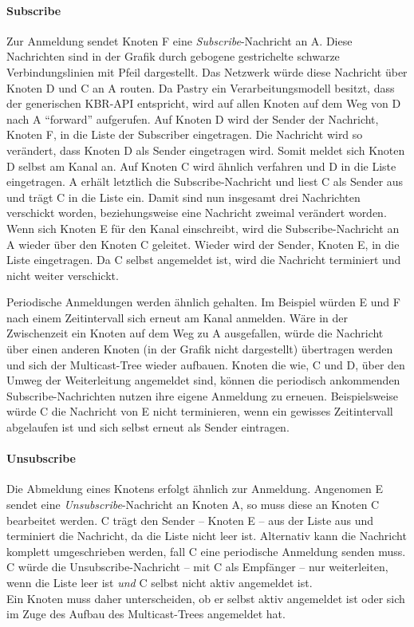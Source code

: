 \paragraph{Subscribe}
Zur Anmeldung sendet Knoten F eine \emph{Subscribe}-Nachricht an A. Diese Nachrichten sind in der Grafik durch gebogene gestrichelte schwarze Verbindungslinien mit Pfeil dargestellt. Das Netzwerk würde diese Nachricht über Knoten D und C an A routen. Da Pastry ein Verarbeitungsmodell besitzt, dass der generischen KBR-API entspricht, wird auf allen Knoten auf dem Weg von D nach A ``forward'' aufgerufen. Auf Knoten D wird der Sender der Nachricht, Knoten F, in die Liste der Subscriber eingetragen. Die Nachricht wird so verändert, dass Knoten D als Sender eingetragen wird. Somit meldet sich Knoten D selbst am Kanal an. Auf Knoten C wird ähnlich verfahren und D in die Liste eingetragen. A erhält letztlich die Subscribe-Nachricht und liest C als Sender aus und trägt C in die Liste ein. Damit sind nun insgesamt drei Nachrichten verschickt worden, beziehungsweise eine Nachricht zweimal verändert worden.\\
Wenn sich Knoten E für den Kanal einschreibt, wird die Subscribe-Nachricht an A wieder über den Knoten C geleitet. Wieder wird der Sender, Knoten E, in die Liste eingetragen. Da C selbst angemeldet ist, wird die Nachricht terminiert und nicht weiter verschickt.

Periodische Anmeldungen werden ähnlich gehalten. Im Beispiel würden E und F nach einem Zeitintervall sich erneut am Kanal anmelden. Wäre in der Zwischenzeit ein Knoten auf dem Weg zu A ausgefallen, würde die Nachricht über einen anderen Knoten (in der Grafik nicht dargestellt) übertragen werden und sich der Multicast-Tree wieder aufbauen. Knoten die wie, C und D, über den Umweg der Weiterleitung angemeldet sind, können die periodisch ankommenden Subscribe-Nachrichten nutzen ihre eigene Anmeldung zu erneuen. Beispielsweise würde C die Nachricht von E nicht terminieren, wenn ein gewisses Zeitintervall abgelaufen ist und sich selbst erneut als Sender eintragen.

\paragraph{Unsubscribe}
Die Abmeldung eines Knotens erfolgt ähnlich zur Anmeldung. Angenomen E sendet eine \emph{Unsubscribe}-Nachricht an Knoten A, so muss diese an Knoten C bearbeitet werden. C trägt den Sender -- Knoten E -- aus der Liste aus und terminiert die Nachricht, da die Liste nicht leer ist. Alternativ kann die Nachricht komplett umgeschrieben werden, fall C eine periodische Anmeldung senden muss. C würde die Unsubscribe-Nachricht -- mit C als Empfänger -- nur weiterleiten, wenn die Liste leer ist \emph{und} C selbst nicht aktiv angemeldet ist.\\
Ein Knoten muss daher unterscheiden, ob er selbst aktiv angemeldet ist oder sich im Zuge des Aufbau des Multicast-Trees angemeldet hat.

